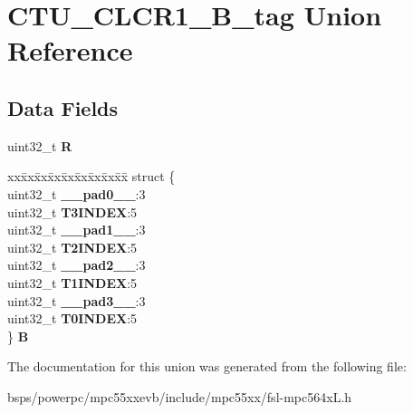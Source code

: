 \hypertarget{unionCTU__CLCR1__32B__tag}{}\section{C\+T\+U\+\_\+\+C\+L\+C\+R1\+\_\+B\+\_\+tag Union Reference}
\label{unionCTU__CLCR1__32B__tag}
\subsection*{Data Fields}
\begin{DoxyCompactItemize}
\item 
\mbox{\label{unionCTU__CLCR1__32B__tag_adff2c33ed2ea89eac5b995eec9935de1}} 
uint32\+\_\+t {\bfseries R}
\item 
\mbox{\label{unionCTU__CLCR1__32B__tag_ab5eb9d0b523e66b5165297a9637e19d1}} 
\begin{tabbing}
xx\=xx\=xx\=xx\=xx\=xx\=xx\=xx\=xx\=\kill
struct \{\\
\>uint32\_t {\bfseries \_\_pad0\_\_}:3\\
\>uint32\_t {\bfseries T3INDEX}:5\\
\>uint32\_t {\bfseries \_\_pad1\_\_}:3\\
\>uint32\_t {\bfseries T2INDEX}:5\\
\>uint32\_t {\bfseries \_\_pad2\_\_}:3\\
\>uint32\_t {\bfseries T1INDEX}:5\\
\>uint32\_t {\bfseries \_\_pad3\_\_}:3\\
\>uint32\_t {\bfseries T0INDEX}:5\\
\} {\bfseries B}\\

\end{tabbing}\end{DoxyCompactItemize}


The documentation for this union was generated from the following file\+:\begin{DoxyCompactItemize}
\item 
bsps/powerpc/mpc55xxevb/include/mpc55xx/fsl-\/mpc564x\+L.\+h\end{DoxyCompactItemize}
